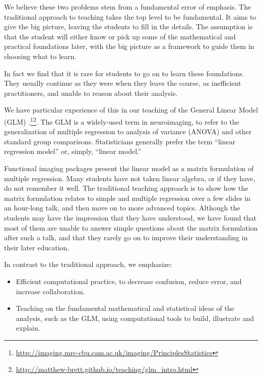 We believe these two problems stem from a fundamental error of emphasis.
The traditional approach to teaching takes the top level to be fundamental.
It aims to give the big picture, leaving the students to fill in the details.
The assumption is that the student will either know or pick up some of the
mathematical and practical foundations later, with the big picture as a
framework to guide them in choosing what to learn.

In fact we find that it is rare for students to go on to learn these
foundations. They usually continue as they were when they leave the course, as
inefficient practitioners, and unable to reason about their analysis.

We have particular experience of this in our teaching of the General Linear
Model (GLM)
\citep{poline2012general}.\footnote{\url{http://imaging.mrc-cbu.cam.ac.uk/imaging/PrinciplesStatistics}}\footnote{\url{http://matthew-brett.github.io/teaching/glm_intro.html}\label{glm_intro}}.
The GLM is a widely-used term in neuroimaging, to refer to the generalization
of multiple regression to analysis of variance (ANOVA) and other standard
group comparisons.  Statisticians generally prefer the term ``linear
regression model'' or, simply, ``linear model.''

Functional imaging packages present the linear model as a matrix formulation
of multiple regression.  Many students have not taken linear algebra, or if
they have, do not remember it well.  The traditional teaching approach is to
show how the matrix formulation relates to simple and multiple regression over
a few slides in an hour-long talk, and then move on to more advanced topics.
Although the students may have the impression that they have understood, we
have found that most of them are unable to answer simple questions about the
matrix formulation after such a talk, and that they rarely go on to improve
their understanding in their later education.


In contrast to the traditional approach, we emphasize:

\begin{itemize}

\item
    Efficient computational practice, to decrease confusion, reduce error, and
        increase collaboration.

\item
    Teaching on the fundamental mathematical and statistical ideas of the
        analysis, such as the GLM, using computational tools to build,
        illustrate and explain.

\end{itemize}

